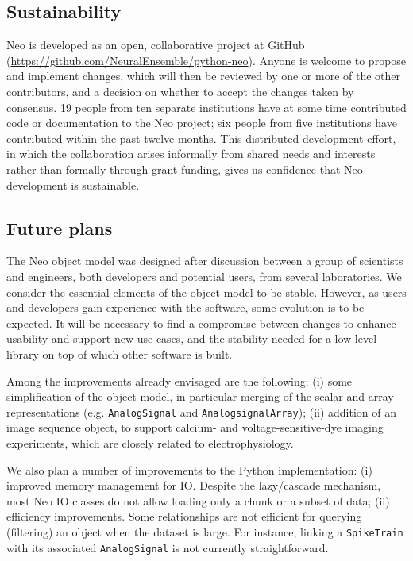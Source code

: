 \documentclass{frontiers}
\begin{document}
\subsection{Sustainability}

Neo is developed as an open, collaborative project at GitHub
(\url{https://github.com/NeuralEnsemble/python-neo}).
Anyone is welcome to propose and implement changes, which will then be reviewed by one or more of the other contributors, and a decision on whether to accept the changes taken by consensus.
19 people from ten separate institutions have at some time contributed code or documentation to the Neo project;  six people from five institutions have contributed within the past twelve months.
This distributed development effort, in which the collaboration arises informally from shared needs and interests rather than formally through grant funding, gives us confidence that Neo development is sustainable.


\subsection{Future plans}

The Neo object model was designed after discussion between a group of scientists and engineers, both developers and potential users, from several laboratories. 
We consider the essential elements of the object model to be stable. 
However, as users and developers gain experience with the software, some evolution is to be expected.
It will be necessary to find a compromise between changes to enhance usability and support new use cases, and the stability needed for a low-level library on top of which other software is built.

Among the improvements already envisaged are the following:
(i) some simplification of the object model, in particular merging of the scalar and array representations (e.g. \lstinline`AnalogSignal` and \lstinline`AnalogsignalArray`);
(ii) addition of an image sequence object, to support calcium- and voltage-sensitive-dye imaging experiments, which are closely related to electrophysiology.

We also plan a number of improvements to the Python implementation:
(i) improved memory management for IO. Despite the lazy/cascade mechanism, most Neo IO classes do not allow loading only a chunk or a subset of data;
(ii) efficiency improvements. Some relationships are not efficient for querying (filtering) an object when the dataset is large. For instance, linking a \lstinline`SpikeTrain` with its associated \lstinline`AnalogSignal` is not currently straightforward.
\end{document}
